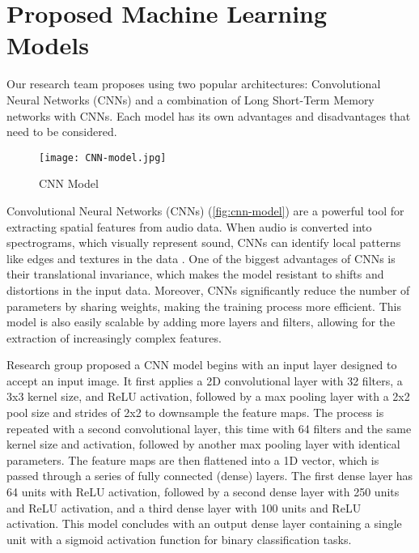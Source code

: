\section{Proposed Machine Learning Models}
Our research team proposes using two popular architectures:
Convolutional Neural Networks (CNNs) and a combination of
Long Short-Term Memory networks with CNNs. Each model has its own
advantages and disadvantages that need to be considered.

\vspace{1em}
\begin{figure}[H]
    \centering
    \texttt{[image: CNN-model.jpg]}
    \caption{CNN Model}
    \label{fig:cnn-model}
\end{figure}
\vspace{1em}

Convolutional Neural Networks (CNNs) (\autoref{fig:cnn-model}) are a powerful tool for extracting spatial
features from audio data. When audio is converted into spectrograms, which visually
represent sound, CNNs can identify local patterns like edges and textures in the data \cite{oshea2015introduction}.
One of the biggest advantages of CNNs is their translational invariance, which makes the
model resistant to shifts and distortions in the input data. Moreover, CNNs significantly
reduce the number of parameters by sharing weights, making the training process more
efficient. This model is also easily scalable by adding more layers and filters, allowing
for the extraction of increasingly complex features.

Research group proposed a CNN model begins with an input layer
designed to accept an input image. It first applies a 2D
convolutional layer with 32 filters, a 3x3 kernel size, and ReLU
activation, followed by a max pooling layer with a 2x2 pool size and
strides of 2x2 to downsample the feature maps. The process is repeated
with a second convolutional layer, this time with 64 filters and the
same kernel size and activation, followed by another max pooling layer
with identical parameters. The feature maps are then flattened into a
1D vector, which is passed through a series of fully connected (dense)
layers. The first dense layer has 64 units with ReLU activation,
followed by a second dense layer with 250 units and ReLU activation,
and a third dense layer with 100 units and ReLU activation. This model
concludes with an output dense layer containing a single unit with a
sigmoid activation function for binary classification tasks.

